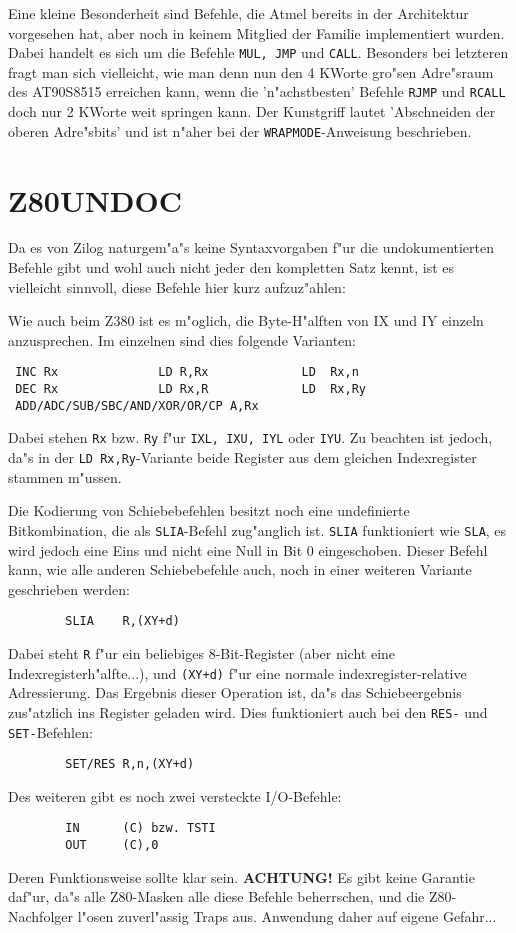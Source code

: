 \documentclass[12pt,a4paper,twoside]{report}
\newcommand{\bb}[1]{{\bf #1}}
\newcommand{\tty}[1]{{\tt #1}}
\begin{document}
Eine kleine Besonderheit sind Befehle, die Atmel bereits in der
Architektur vorgesehen hat, aber noch in keinem Mitglied der Familie
implementiert wurden.  Dabei handelt es sich um die Befehle {\tt MUL, JMP}
und {\tt CALL}.  Besonders bei letzteren fragt man sich vielleicht, wie man
denn nun den 4 KWorte gro"sen Adre"sraum des AT90S8515 erreichen kann,
wenn die 'n"achstbesten' Befehle {\tt RJMP} und {\tt RCALL} doch nur 2
KWorte weit springen kann.  Der Kunstgriff lautet 'Abschneiden der oberen
Adre"sbits' und ist n"aher bei der {\tt WRAPMODE}-Anweisung beschrieben.


\section{Z80UNDOC}

Da es von Zilog naturgem"a"s keine Syntaxvorgaben f"ur die undokumentierten
Befehle gibt und wohl auch nicht jeder den kompletten Satz kennt,
ist es vielleicht sinnvoll, diese Befehle hier kurz aufzuz"ahlen:
\par
Wie auch beim Z380 ist es m"oglich, die Byte-H"alften von IX und IY
einzeln anzusprechen.  Im einzelnen sind dies folgende Varianten:
\begin{verbatim}
 INC Rx              LD R,Rx             LD  Rx,n
 DEC Rx              LD Rx,R             LD  Rx,Ry
 ADD/ADC/SUB/SBC/AND/XOR/OR/CP A,Rx
\end{verbatim}
Dabei stehen \tty{Rx} bzw. \tty{Ry} f"ur \tty{IXL, IXU, IYL} oder
\tty{IYU}.  Zu beachten ist jedoch, da"s in der \tty{LD Rx,Ry}-Variante
beide Register aus dem gleichen Indexregister stammen m"ussen.
\par
Die Kodierung von Schiebebefehlen besitzt noch eine undefinierte
Bitkombination, die als \tty{SLIA}-Befehl zug"anglich ist.  \tty{SLIA}
funktioniert wie \tty{SLA}, es wird jedoch eine Eins und nicht eine Null
in Bit 0 eingeschoben.  Dieser Befehl kann, wie alle anderen
Schiebebefehle auch, noch in einer weiteren Variante geschrieben
werden:
\begin{verbatim}
        SLIA    R,(XY+d)
\end{verbatim}
Dabei steht \tty{R} f"ur ein beliebiges 8-Bit-Register (aber nicht eine
Indexregisterh"alfte...), und \tty{(XY+d)} f"ur eine normale
indexregister-relative Adressierung.  Das Ergebnis dieser Operation
ist, da"s das Schiebeergebnis zus"atzlich ins Register geladen wird.
Dies funktioniert auch bei den \tty{RES-} und \tty{SET-}Befehlen:
\begin{verbatim}
        SET/RES R,n,(XY+d)
\end{verbatim}
Des weiteren gibt es noch zwei versteckte I/O-Befehle:
\begin{verbatim}
        IN      (C) bzw. TSTI
        OUT     (C),0
\end{verbatim}
Deren Funktionsweise sollte klar sein.  \bb{ACHTUNG!} Es gibt keine
Garantie daf"ur, da"s alle Z80-Masken alle diese Befehle beherrschen,
und die Z80-Nachfolger l"osen zuverl"assig Traps aus.  Anwendung
daher auf eigene Gefahr...
\end{document}
